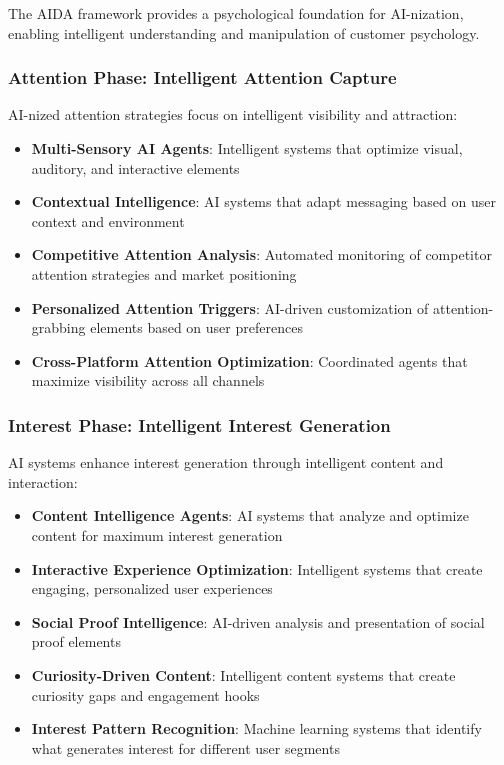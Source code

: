 The AIDA framework provides a psychological foundation for AI-nization, enabling intelligent understanding and manipulation of customer psychology.

\subsubsection{Attention Phase: Intelligent Attention Capture}

AI-nized attention strategies focus on intelligent visibility and attraction:

\begin{itemize}
    \item \textbf{Multi-Sensory AI Agents}: Intelligent systems that optimize visual, auditory, and interactive elements
    \item \textbf{Contextual Intelligence}: AI systems that adapt messaging based on user context and environment
    \item \textbf{Competitive Attention Analysis}: Automated monitoring of competitor attention strategies and market positioning
    \item \textbf{Personalized Attention Triggers}: AI-driven customization of attention-grabbing elements based on user preferences
    \item \textbf{Cross-Platform Attention Optimization}: Coordinated agents that maximize visibility across all channels
\end{itemize}

\subsubsection{Interest Phase: Intelligent Interest Generation}

AI systems enhance interest generation through intelligent content and interaction:

\begin{itemize}
    \item \textbf{Content Intelligence Agents}: AI systems that analyze and optimize content for maximum interest generation
    \item \textbf{Interactive Experience Optimization}: Intelligent systems that create engaging, personalized user experiences
    \item \textbf{Social Proof Intelligence}: AI-driven analysis and presentation of social proof elements
    \item \textbf{Curiosity-Driven Content}: Intelligent content systems that create curiosity gaps and engagement hooks
    \item \textbf{Interest Pattern Recognition}: Machine learning systems that identify what generates interest for different user segments
\end{itemize}

